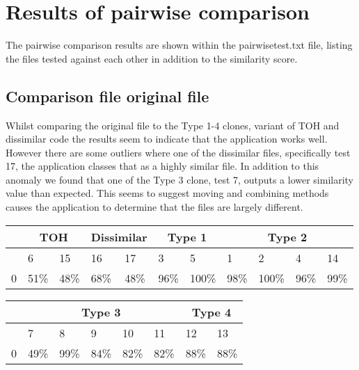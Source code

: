 \section{Results of pairwise comparison}
The pairwise comparison results are shown within the pairwisetest.txt file, listing the files tested against each other in addition to the similarity score. 

\subsection{Comparison file original file}
Whilst comparing the original file to the Type 1-4 clones, variant of TOH and dissimilar code the results seem to indicate that the application works well. However there are some outliers where one of the dissimilar files, specifically test 17, the application classes that as a highly similar file. In addition to this anomaly we found that one of the Type 3 clone, test 7, outputs a lower similarity value than expected. This seems to suggest moving and combining methods causes the application to determine that the files are largely different.
\begin{table}[h]
\begin{tabular}{|l|l|l|l|l|l|l|l|l|l|l|}
\hline
& \multicolumn{2}{|c|}{TOH} & \multicolumn{2}{|c|}{Dissimilar} & \multicolumn{2}{|c|}{Type 1} & \multicolumn{4}{|c|}{Type 2}  \\
\hline
  & 6    & 15  & 16   & 17 & 3   & 5 & 1   & 2 & 4 & 14  \\
  \hline
0 & 51\% & 48\% & 68\% & 48\% & 96\% & 100\% & 98\% & 100\% & 96\% & 99\% \\
\hline
\end{tabular}
\end{table}
\begin{table}[h]
\begin{tabular}{|l|l|l|l|l|l|l|l|}
\hline
& \multicolumn{5}{|c|}{Type 3} & \multicolumn{2}{|c|}{Type 4} \\
\hline
  & 7   & 8 & 9 & 10 & 11 & 12 & 13 \\
  \hline
0 & 49\% & 99\% & 84\% & 82\% & 82\% & 88\% & 88\% \\
\hline
\end{tabular}
\end{table}

